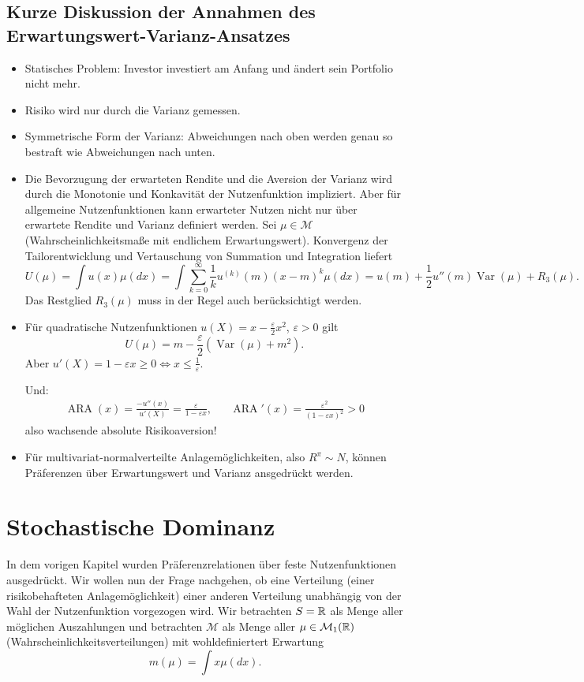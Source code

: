 \documentclass[a4paper,twoside,DIV15,BCOR12mm]{scrbook}
\newcommand{\cM}{\mathcal M}
\DeclareMathOperator{\ARA}{ARA}
\DeclareMathOperator{\Var}{Var}
\begin{document}
\subsection{Kurze Diskussion der Annahmen des Erwartungswert-Varianz-Ansatzes}

\begin{itemize}
\item Statisches Problem: Investor investiert am Anfang und ändert sein Portfolio nicht mehr.
\item Risiko wird nur durch die Varianz gemessen.
\item Symmetrische Form der Varianz: Abweichungen nach oben werden genau so bestraft wie Abweichungen nach unten.
\item Die Bevorzugung der erwarteten Rendite und die Aversion der Varianz wird durch die Monotonie und Konkavität der Nutzenfunktion impliziert. Aber für allgemeine Nutzenfunktionen kann erwarteter Nutzen nicht nur über erwartete Rendite und Varianz definiert werden. Sei $\mu\in\cM$ (Wahrscheinlichkeitsmaße mit endlichem Erwartungswert). Konvergenz der Tailorentwicklung und Vertauschung von Summation und Integration liefert 
\[
U(\mu) = \int u(x)\mu(dx) = \int \sum_{k=0}^\infty \frac 1k u^{(k)}(m)(x-m)^k\mu(dx) = u(m) + \frac12 u''(m)\Var(\mu) + R_3(\mu).
\]
Das Restglied $R_3(\mu)$ muss in der Regel auch berücksichtigt werden.

\item Für quadratische Nutzenfunktionen $u(X)=x-\frac\varepsilon2x^2$, $\varepsilon>0$ gilt
\[
U(\mu) = m - \frac\varepsilon2(\Var(\mu) + m^2).
\]
Aber $u'(X) = 1-\varepsilon x \ge 0 \iff x\le \frac1\varepsilon$. 

Und:
\begin{align*}
\ARA(x) = \frac{-u''(x)}{u'(X)} = \frac\varepsilon{1-\varepsilon x},&&
\ARA'(x) = \frac{\varepsilon^2}{(1-\varepsilon x)^2} > 0
\end{align*}
also wachsende absolute Risikoaversion!
\item Für multivariat-normalverteilte Anlagemöglichkeiten, also $R^{\pi}\sim N$, können Präferenzen über Erwartungswert und Varianz ansgedrückt werden.
\end{itemize}

\section{Stochastische Dominanz}
In dem vorigen Kapitel wurden Präferenzrelationen über feste Nutzenfunktionen ausgedrückt. Wir wollen nun der Frage nachgehen, ob eine Verteilung (einer risikobehafteten Anlagemöglichkeit) einer anderen Verteilung unabhängig von der Wahl der Nutzenfunktion vorgezogen wird. Wir betrachten $S=\mathbb{R}$ als Menge aller möglichen Auszahlungen und betrachten $\cM$ als Menge aller $\mu\in\cM_1(\MdR)$ (Wahrscheinlichkeitsverteilungen) mit wohldefiniertert Erwartung \[m(\mu)=\int x\mu(dx).\]
\end{document}
